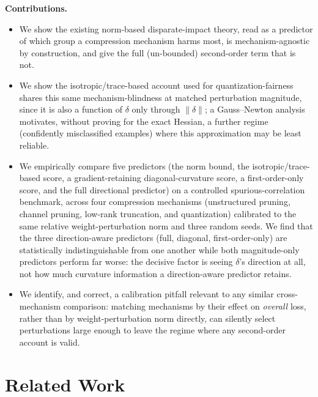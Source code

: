\documentclass{article}
\begin{document}
\textbf{Contributions.}
\begin{itemize}
  \item We show the existing norm-based disparate-impact theory, read as a predictor of which group a compression mechanism harms most, is mechanism-agnostic by construction, and give the full (un-bounded) second-order term that is not.
  \item We show the isotropic/trace-based account used for quantization-fairness \citep{liu2025understanding,bellam2024causes,bellam2025explaining} shares this same mechanism-blindness at matched perturbation magnitude, since it is also a function of $\delta$ only through $\|\delta\|$; a Gauss--Newton analysis motivates, without proving for the exact Hessian, a further regime (confidently misclassified examples) where this approximation may be least reliable.
  \item We empirically compare five predictors (the norm bound, the isotropic/trace-based score, a gradient-retaining diagonal-curvature score, a first-order-only score, and the full directional predictor) on a controlled spurious-correlation benchmark, across four compression mechanisms (unstructured pruning, channel pruning, low-rank truncation, and quantization) calibrated to the same relative weight-perturbation norm and three random seeds. We find that the three direction-aware predictors (full, diagonal, first-order-only) are statistically indistinguishable from one another while both magnitude-only predictors perform far worse: the decisive factor is seeing $\delta$'s direction at all, not how much curvature information a direction-aware predictor retains.
  \item We identify, and correct, a calibration pitfall relevant to any similar cross-mechanism comparison: matching mechanisms by their effect on \emph{overall} loss, rather than by weight-perturbation norm directly, can silently select perturbations large enough to leave the regime where any second-order account is valid.
\end{itemize}

\section{Related Work}
\label{sec:related}
\end{document}
